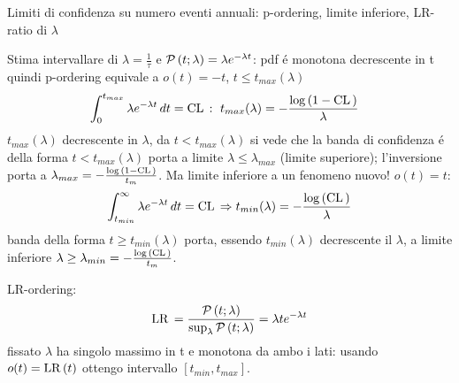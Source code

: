 \begin{frame}{Limiti di confidenza su numero eventi annuali: p-ordering, limite inferiore, LR-ratio di $\lambda$}

Stima intervallare di $\lambda=\frac{1}{\tau}$ e $\operatorname{\mathcal{P}}{(t;\lambda)}=\lambda e^{-\lambda t}$: pdf \'e monotona decrescente in t quindi p-ordering equivale a $o(t)=-t$, $t\leq t_{max}(\lambda)$
\begin{align*}
&\int_0^{t_{max}}\lambda\exp{-\lambda t}\,dt=\cl{}:\ t_{max}(\lambda)=-\frac{\log{(1-\cl{})}}{\lambda}
\end{align*}
$t_{max}(\lambda)$ decrescente in $\lambda$, da $t<t_{max}(\lambda)$ si vede che la banda di confidenza \'e della forma $t<t_{max}(\lambda)$ porta a limite $\lambda\leq\lambda_{max}$ (limite superiore); l'inversione porta a $\lambda_{max}=-\frac{\log{(1-\operatorname{CL}{})}}{t_m}$.
Ma limite inferiore a un fenomeno nuovo! $o(t)=t$:
\begin{equation*}
\int_{t_{min}}^{\infty}\lambda e^{-\lambda t}\,dt=\operatorname{CL}{}\Rightarrow t_{min}(\lambda)=-\frac{\log{(\operatorname{CL}{})}}{\lambda}
\end{equation*}
banda della forma $t\geq t_{min}(\lambda)$ porta, essendo $t_{min}(\lambda)$ decrescente il $\lambda$, a limite inferiore $\lambda\geq\lambda_{min}=-\frac{\log{(\operatorname{CL}{})}}{t_m}$. 

LR-ordering:
\begin{equation*}
\operatorname{LR}{}=\frac{\operatorname{\mathcal{P}}{(t;\lambda)}}{\sup_{\lambda}\operatorname{\mathcal{P}}{(t;\lambda)}}=\lambda te^{-\lambda t}
\end{equation*}
fissato $\lambda$ ha singolo massimo in t e monotona da ambo i lati: usando $o(t)=\operatorname{LR}{(t)}$ ottengo intervallo $[t_{min},t_{max}]$.
\end{frame}

